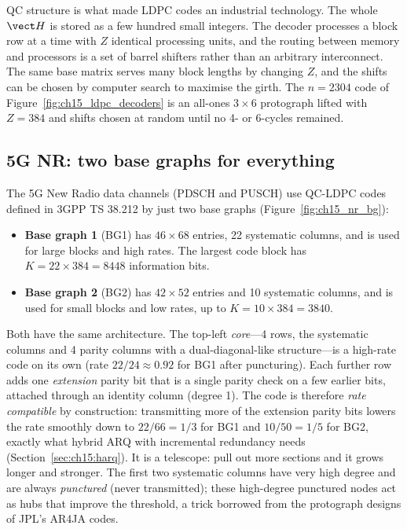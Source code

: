 QC structure is what made LDPC codes an industrial technology. The whole $\vect H$ is stored as a few
hundred small integers. The decoder processes a block row at a time with $Z$ identical processing
units, and the routing between memory and processors is a set of barrel shifters rather than an
arbitrary interconnect. The same base matrix serves many block lengths by changing $Z$, and the
shifts can be chosen by computer search to maximise the girth. The $n=2304$ code of
Figure~\ref{fig:ch15_ldpc_decoders} is an all-ones $3\times6$ protograph lifted with $Z=384$ and
shifts chosen at random until no 4- or 6-cycles remained.

\subsection{5G NR: two base graphs for everything}

The 5G New Radio data channels (PDSCH and PUSCH) use QC-LDPC codes defined in 3GPP TS 38.212 by just
two base graphs (Figure~\ref{fig:ch15_nr_bg}):
\begin{itemize}
\item \textbf{Base graph 1} (BG1) has $46\times68$ entries, 22 systematic columns, and is used for
large blocks and high rates. The largest code block has $K=22\times384=8448$ information bits.
\item \textbf{Base graph 2} (BG2) has $42\times52$ entries and 10 systematic columns, and is used for
small blocks and low rates, up to $K=10\times384=3840$.
\end{itemize}
Both have the same architecture. The top-left \emph{core}---4 rows, the systematic columns and 4 parity
columns with a dual-diagonal-like structure---is a high-rate code on its own (rate $22/24\approx0.92$
for BG1 after puncturing). Each further row adds one \emph{extension} parity bit that is a single
parity check on a few earlier bits, attached through an identity column (degree 1). The code is
therefore \emph{rate compatible} by construction: transmitting more of the extension parity bits
lowers the rate smoothly down to $22/66=1/3$ for BG1 and $10/50=1/5$ for BG2, exactly what hybrid ARQ
with incremental redundancy needs (Section~\ref{sec:ch15:harq}). It is a telescope: pull out more
sections and it grows longer and stronger. The first two systematic columns have very high degree
and are always \emph{punctured} (never transmitted); these high-degree punctured nodes act as hubs
that improve the threshold, a trick borrowed from the protograph designs of JPL's AR4JA codes.

